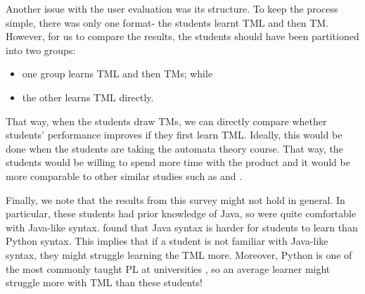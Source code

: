 Another issue with the user evaluation was its structure. To keep the process simple, there was only one format- the students learnt TML and then TM. However, for us to compare the results, the students should have been partitioned into two groups:
\begin{itemize}
    \item one group learns TML and then TMs; while
    \item the other learns TML directly.
\end{itemize}
That way, when the students draw TMs, we can directly compare whether students' performance improves if they first learn TML. Ideally, this would be done when the students are taking the automata theory course. That way, the students would be willing to spend more time with the product and it would be more comparable to other similar studies such as \citet{rodger2009increasing} and \citet{pillay2010learning}.

Finally, we note that the results from this survey might not hold in general. In particular, these students had prior knowledge of Java, so were quite comfortable with Java-like syntax. \citet{lo2015programming} found that Java syntax is harder for students to learn than Python syntax. This implies that if a student is not familiar with Java-like syntax, they might struggle learning the TML more. Moreover, Python is one of the most commonly taught PL at universities \citep{meszarosova2015python}, so an average learner might struggle more with TML than these students!
